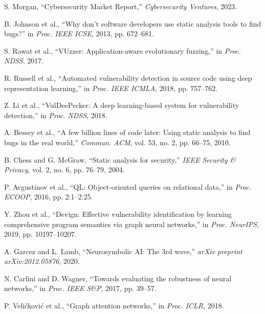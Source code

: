 \documentclass[10pt,journal,compsoc]{IEEEtran}
\begin{document}

\begin{thebibliography}{10}

S. Morgan, ``Cybersecurity Market Report,'' \emph{Cybersecurity Ventures}, 2023.

B. Johnson et al., ``Why don't software developers use static analysis tools to find bugs?'' in \emph{Proc. IEEE ICSE}, 2013, pp. 672--681.

S. Rawat et al., ``VUzzer: Application-aware evolutionary fuzzing,'' in \emph{Proc. NDSS}, 2017.

R. Russell et al., ``Automated vulnerability detection in source code using deep representation learning,'' in \emph{Proc. IEEE ICMLA}, 2018, pp. 757--762.

Z. Li et al., ``VulDeePecker: A deep learning-based system for vulnerability detection,'' in \emph{Proc. NDSS}, 2018.

A. Bessey et al., ``A few billion lines of code later: Using static analysis to find bugs in the real world,'' \emph{Commun. ACM}, vol. 53, no. 2, pp. 66--75, 2010.

B. Chess and G. McGraw, ``Static analysis for security,'' \emph{IEEE Security \& Privacy}, vol. 2, no. 6, pp. 76--79, 2004.

P. Avgustinov et al., ``QL: Object-oriented queries on relational data,'' in \emph{Proc. ECOOP}, 2016, pp. 2:1--2:25.

Y. Zhou et al., ``Devign: Effective vulnerability identification by learning comprehensive program semantics via graph neural networks,'' in \emph{Proc. NeurIPS}, 2019, pp. 10197--10207.

A. Garcez and L. Lamb, ``Neurosymbolic AI: The 3rd wave,'' \emph{arXiv preprint arXiv:2012.05876}, 2020.

N. Carlini and D. Wagner, ``Towards evaluating the robustness of neural networks,'' in \emph{Proc. IEEE S\&P}, 2017, pp. 39--57.

P. Veli\v{c}kovi\'{c} et al., ``Graph attention networks,'' in \emph{Proc. ICLR}, 2018.

\end{thebibliography}
\end{document}
